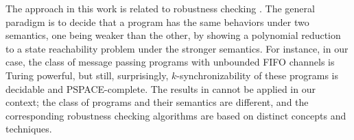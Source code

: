 The approach in this work is related to robustness checking \cite{DBLP:conf/se/BouajjaniDM14,DBLP:conf/esop/BouajjaniEEOT17}. The general paradigm is to decide that a program has the same behaviors under two semantics, one being weaker than the other, by showing a polynomial reduction to a state reachability problem under the stronger semantics.
For instance, in our case, the class of message passing programs with unbounded FIFO channels is Turing powerful, but still, surprisingly, $k$-synchronizability of these programs is decidable and PSPACE-complete. %
The results in \cite{DBLP:conf/se/BouajjaniDM14,DBLP:conf/esop/BouajjaniEEOT17} cannot be applied in our context; 
the class of programs and their semantics are different, and the corresponding robustness checking algorithms are based on distinct concepts and techniques.


